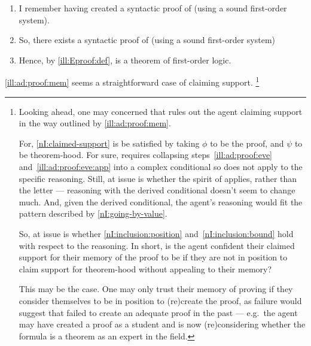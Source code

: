 \begin{note}[Memory]
  \begin{illustration}\label{ill:ad:proof:mem}
    \begin{enumerate}
    \item\label{ill:Eproof:mem} I remember having created a syntactic proof of  (using a sound first-order system).
    \item\label{ill:Eproof:exP} So, there exists a syntactic proof of  (using a sound first-order system)
    \item\label{ill:Eproof:thm} Hence, by \ref{ill:Eproof:def},  is a theorem of first-order logic.
    \end{enumerate}
  \end{illustration}

  \autoref{ill:ad:proof:mem} seems a straightforward case of claiming support.\nolinebreak
    \footnote{
      Looking ahead, one may concerned that \nI{} rules out the agent claiming support in the way outlined by \ref{ill:ad:proof:mem}.

      For, \ref{nI:claimed-support} is be satisfied by taking \(\phi\) to be the proof, and \(\psi\) to be theorem-hood.
      For sure, requires collapsing steps~\ref{ill:ad:proof:eve} and~\ref{ill:ad:proof:eve:app} into a complex conditional so \nI{} does not apply to the specific reasoning.
      Still, at issue is whether the spirit of \nI{} applies, rather than the letter --- reasoning with the derived conditional doesn't seem to change much.
      And, given the derived conditional, the agent's reasoning would fit the pattern described by \ref{nI:going-by-value}.

      So, at issue is whether \ref{nI:inclusion:position} and~\ref{nI:inclusion:bound} hold with respect to the reasoning.
      In short, is the agent confident their claimed support for their memory of the proof to be \mom{} if they are not in position to claim support for theorem-hood without appealing to their memory?

      This may be the case.
      One may only trust their memory of proving if they consider themselves to be in position to (re)create the proof, as failure would suggest that failed to create an adequate proof in the past --- e.g.\ the agent may have created a proof as a student and is now (re)considering whether the formula is a theorem as an expert in the field.

}
\end{note}
